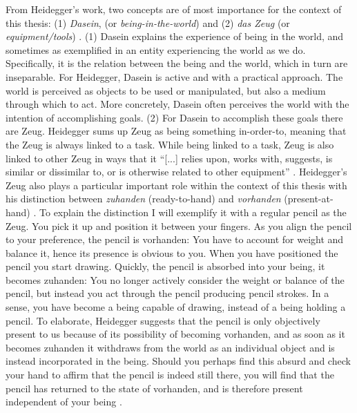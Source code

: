 From Heidegger's work, two concepts are of most importance for the context of this thesis: (1) \textit{Dasein}, (or \textit{being-in-the-world}) and (2) \textit{das Zeug} (or \textit{equipment/tools}) \cite{heidegger}.
(1) Dasein explains the experience of being in the world, and sometimes as exemplified in an entity experiencing the world as we do. Specifically, it is the relation between the being and the world, which in turn are inseparable. For Heidegger, Dasein is active and with a practical approach. The world is perceived as objects to be used or manipulated, but also a medium through which to act. More concretely, Dasein often perceives the world with the intention of accomplishing goals.
(2) For Dasein to accomplish these goals there are Zeug. Heidegger sums up Zeug as being something in-order-to, meaning that the Zeug is always linked to a task. While being linked to a task, Zeug is also linked to other Zeug in ways that it ``[...] relies upon, works with, suggests, is similar or dissimilar to, or is otherwise related to other equipment'' \cite[p. 109]{dourish}. Heidegger's Zeug also plays a particular important role within the context of this thesis with his distinction between \textit{zuhanden} (ready-to-hand) and \textit{vorhanden} (present-at-hand) \cite{heidegger}. To explain the distinction I will exemplify it with a regular pencil as the Zeug. You pick it up and position it between your fingers. As you align the pencil to your preference, the pencil is vorhanden: You have to account for weight and balance it, hence its presence is obvious to you. When you have positioned the pencil you start drawing. Quickly, the pencil is absorbed into your being, it becomes zuhanden: You no longer actively consider the weight or balance of the pencil, but instead you act through the pencil producing pencil strokes. In a sense, you have become a being capable of drawing, instead of a being holding a pencil. To elaborate, Heidegger suggests that the pencil is only objectively present to us because of its possibility of becoming vorhanden, and as soon as it becomes zuhanden it withdraws from the world as an individual object and is instead incorporated in the being. Should you perhaps find this absurd and check your hand to affirm that the pencil is indeed still there, you will find that the pencil has returned to the state of vorhanden, and is therefore present independent of your being \cite{dourish}.

